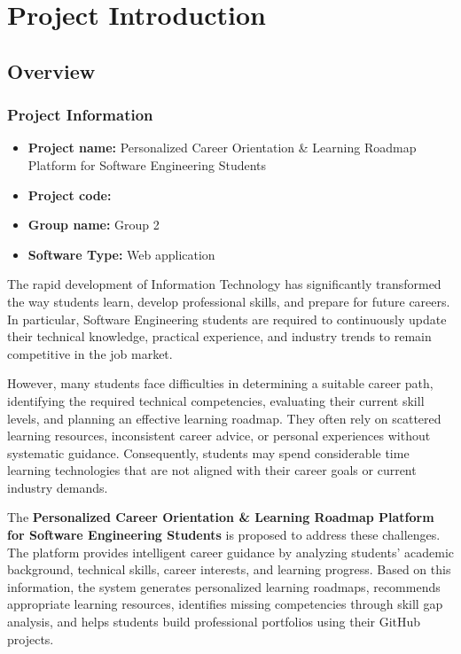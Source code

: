 
\chapter{Project Introduction}

\section{Overview}

\subsection{Project Information}

\begin{itemize}
    \item \textbf{Project name:} Personalized Career Orientation \& Learning Roadmap Platform for Software Engineering Students
    \item \textbf{Project code:}
    \item \textbf{Group name:} Group 2
    \item \textbf{Software Type:} Web application
\end{itemize}

The rapid development of Information Technology has significantly transformed the way students learn, develop professional skills, and prepare for future careers. In particular, Software Engineering students are required to continuously update their technical knowledge, practical experience, and industry trends to remain competitive in the job market.

However, many students face difficulties in determining a suitable career path, identifying the required technical competencies, evaluating their current skill levels, and planning an effective learning roadmap. They often rely on scattered learning resources, inconsistent career advice, or personal experiences without systematic guidance. Consequently, students may spend considerable time learning technologies that are not aligned with their career goals or current industry demands.

The \textbf{Personalized Career Orientation \& Learning Roadmap Platform for Software Engineering Students} is proposed to address these challenges. The platform provides intelligent career guidance by analyzing students’ academic background, technical skills, career interests, and learning progress. Based on this information, the system generates personalized learning roadmaps, recommends appropriate learning resources, identifies missing competencies through skill gap analysis, and helps students build professional portfolios using their GitHub projects.

